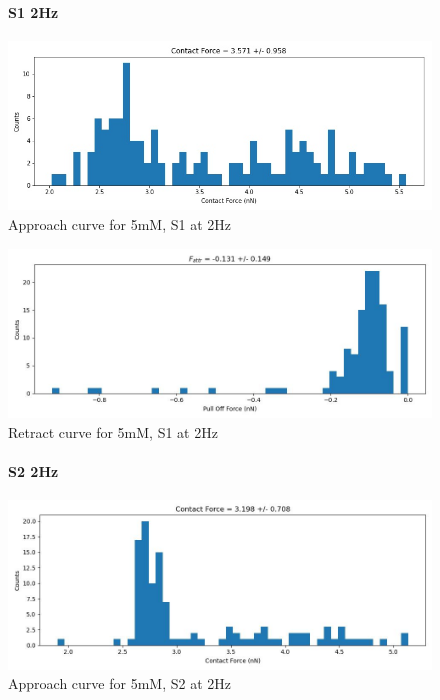 \begin{figure}[h!]
\paragraph{S1 2Hz}
\centering
\includegraphics[width=\textwidth]{chapter7/Tip speed/5mM/S1 2Hz/approach_f_c_hist.jpg}
\caption{Approach curve for 5mM, S1 at 2Hz}
\end{figure}

\begin{figure}[h!]
\centering
\includegraphics[width=\textwidth]{chapter7/Tip speed/5mM/S1 2Hz/retract_f_a_hist.jpg}
\caption{Retract curve for 5mM, S1 at 2Hz}
\end{figure}
\newpage


\begin{figure}[h!]
\paragraph{S2 2Hz}
\centering
\includegraphics[width=\textwidth]{chapter7/Tip speed/5mM/S2 2Hz/approach_f_c_hist.jpg}
\caption{Approach curve for 5mM, S2 at 2Hz}
\end{figure}


